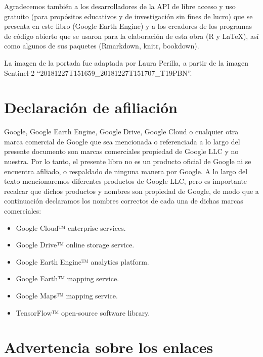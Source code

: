 \documentclass[
  12pt,
  letterpaper,
  twoside]{book}
\providecommand{\tightlist}{%
  \setlength{\itemsep}{0pt}\setlength{\parskip}{0pt}}
\begin{document}
Agradecemos también a los desarrolladores de la API de libre acceso y uso gratuito (para propósitos educativos y de investigación sin fines de lucro) que se presenta en este libro (Google Earth Engine) y a los creadores de los programas de código abierto que se usaron para la elaboración de esta obra (R y LaTeX), así como algunos de sus paquetes (Rmarkdown, knitr, bookdown).

La imagen de la portada fue adaptada por Laura Perilla, a partir de la imagen Sentinel-2 ``20181227T151659\_20181227T151707\_T19PBN''.

\newpage

\hypertarget{declaraciuxf3n-de-afiliaciuxf3n}{%
\chapter*{Declaración de afiliación}\label{declaraciuxf3n-de-afiliaciuxf3n}}

Google, Google Earth Engine, Google Drive, Google Cloud o cualquier otra marca comercial de Google que sea mencionada o referenciada a lo largo del presente documento son marcas comerciales propiedad de Google LLC y no nuestra. Por lo tanto, el presente libro no es un producto oficial de Google ni se encuentra afiliado, o respaldado de ninguna manera por Google.
A lo largo del texto mencionaremos diferentes productos de Google LLC, pero es importante recalcar que dichos productos y nombres son propiedad de Google, de modo que a continuación declaramos los nombres correctos de cada una de dichas marcas comerciales:

\begin{itemize}
\tightlist
\item
  Google Cloud™ enterprise services.
\item
  Google Drive™ online storage service.
\item
  Google Earth Engine™ analytics platform.
\item
  Google Earth™ mapping service.
\item
  Google Maps™ mapping service.
\item
  TensorFlow™ open-source software library.
\end{itemize}

\hypertarget{advertencia-sobre-los-enlaces}{%
\chapter*{Advertencia sobre los enlaces}\label{advertencia-sobre-los-enlaces}}
\end{document}
